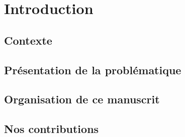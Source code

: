 
\chapter{Introduction}

\section{Contexte}

\section{Présentation de la problématique}

\section{Organisation de ce manuscrit}

\section{Nos contributions}


